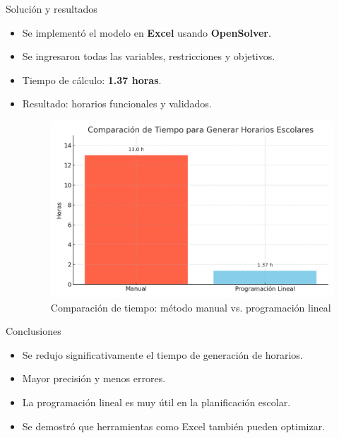 \documentclass{beamer}
\begin{document}
\begin{frame}{Solución y resultados}
  \begin{itemize}
    \item Se implementó el modelo en \textbf{Excel} usando \textbf{OpenSolver}.
    \item Se ingresaron todas las variables, restricciones y objetivos.
    \item Tiempo de cálculo: \textbf{1.37 horas}.
    \item Resultado: horarios funcionales y validados.
\begin{figure}[H]
    \centering
    \includegraphics[width=0.7\linewidth]{comparacion_tiempos_horarios.png}
    \caption{Comparación de tiempo: método manual vs. programación lineal}
\end{figure}

  \end{itemize}
\end{frame}

\begin{frame}{Conclusiones}
  \begin{itemize}
    \item Se redujo significativamente el tiempo de generación de horarios.
    \item Mayor precisión y menos errores.
    \item La programación lineal es muy útil en la planificación escolar.
    \item Se demostró que herramientas como Excel también pueden optimizar.
  \end{itemize}
\end{frame}
\end{document}
